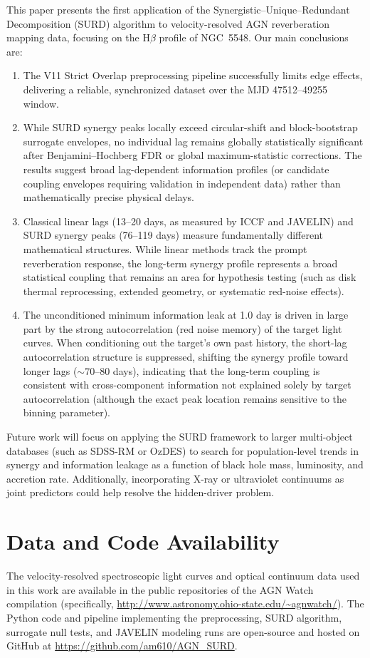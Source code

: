 \documentclass[12pt, a4paper]{article}
\begin{document}
This paper presents the first application of the Synergistic–Unique–Redundant Decomposition (SURD) algorithm to velocity-resolved AGN reverberation mapping data, focusing on the H\(\beta\) profile of NGC~5548. Our main conclusions are:
\begin{enumerate}
\item The V11 Strict Overlap preprocessing pipeline successfully limits edge effects, delivering a reliable, synchronized dataset over the MJD 47512--49255 window.
\item While SURD synergy peaks locally exceed circular-shift and block-bootstrap surrogate envelopes, no individual lag remains globally statistically significant after Benjamini–Hochberg FDR or global maximum-statistic corrections. The results suggest broad lag-dependent information profiles (or candidate coupling envelopes requiring validation in independent data) rather than mathematically precise physical delays.
\item Classical linear lags (13--20 days, as measured by ICCF and JAVELIN) and SURD synergy peaks (76--119 days) measure fundamentally different mathematical structures. While linear methods track the prompt reverberation response, the long-term synergy profile represents a broad statistical coupling that remains an area for hypothesis testing (such as disk thermal reprocessing, extended geometry, or systematic red-noise effects).
\item The unconditioned minimum information leak at 1.0 day is driven in large part by the strong autocorrelation (red noise memory) of the target light curves. When conditioning out the target's own past history, the short-lag autocorrelation structure is suppressed, shifting the synergy profile toward longer lags ($\sim 70$--80 days), indicating that the long-term coupling is consistent with cross-component information not explained solely by target autocorrelation (although the exact peak location remains sensitive to the binning parameter).
\end{enumerate}

Future work will focus on applying the SURD framework to larger multi-object databases (such as SDSS-RM or OzDES) to search for population-level trends in synergy and information leakage as a function of black hole mass, luminosity, and accretion rate. Additionally, incorporating X-ray or ultraviolet continuums as joint predictors could help resolve the hidden-driver problem.

\section*{Data and Code Availability}
The velocity-resolved spectroscopic light curves and optical continuum data used in this work are available in the public repositories of the AGN Watch compilation (specifically, \url{http://www.astronomy.ohio-state.edu/~agnwatch/}). The Python code and pipeline implementing the preprocessing, SURD algorithm, surrogate null tests, and JAVELIN modeling runs are open-source and hosted on GitHub at \url{https://github.com/am610/AGN_SURD}.

\printbibliography

%
%
\end{document}
